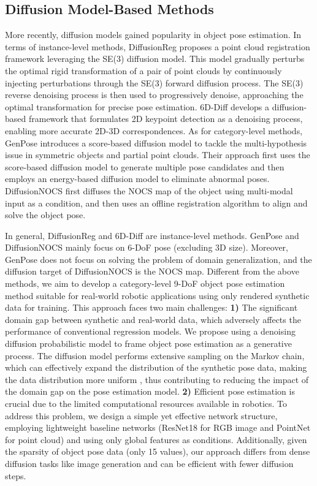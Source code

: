 \vspace{-1em}
\subsection{Diffusion Model-Based Methods}
\par More recently, diffusion models gained popularity in object pose estimation. In terms of instance-level methods, DiffusionReg \cite{DiffusionReg} proposes a point cloud registration framework leveraging the SE(3) diffusion model. This model gradually perturbs the optimal rigid transformation of a pair of point clouds by continuously injecting perturbations through the SE(3) forward diffusion process. The SE(3) reverse denoising process is then used to progressively denoise, approaching the optimal transformation for precise pose estimation. 6D-Diff \cite{6D-Diff} develops a diffusion-based framework that formulates 2D keypoint detection as a denoising process, enabling more accurate 2D-3D correspondences. As for category-level methods, GenPose \cite{42} introduces a score-based diffusion model to tackle the multi-hypothesis issue in symmetric objects and partial point clouds. Their approach first uses the score-based diffusion model to generate multiple pose candidates and then employs an energy-based diffusion model to eliminate abnormal poses. DiffusionNOCS \cite{DiffusionNOCS} first diffuses the NOCS map of the object using multi-modal input as a condition, and then uses an offline registration algorithm to align and solve the object pose.

\par In general, DiffusionReg \cite{DiffusionReg} and 6D-Diff \cite{6D-Diff} are instance-level methods. GenPose \cite{42} and DiffusionNOCS \cite{DiffusionNOCS} mainly focus on 6-DoF pose (excluding 3D size). Moreover, GenPose does not focus on solving the problem of domain generalization, and the diffusion target of DiffusionNOCS is the NOCS map. Different from the above methods, we aim to develop a category-level 9-DoF object pose estimation method suitable for real-world robotic applications using only rendered synthetic data for training. This approach faces two main challenges: \textbf{1)} The significant domain gap between synthetic and real-world data, which adversely affects the performance of conventional regression models. We propose using a denoising diffusion probabilistic model to frame object pose estimation as a generative process. The diffusion model performs extensive sampling on the Markov chain, which can effectively expand the distribution of the synthetic pose data, making the data distribution more uniform \cite{Ed-sam}, thus contributing to reducing the impact of the domain gap on the pose estimation model. \textbf{2)} Efficient pose estimation is crucial due to the limited computational resources available in robotics. To address this problem, we design a simple yet effective network structure, employing lightweight baseline networks (ResNet18 \cite{52} for RGB image and PointNet \cite{53} for point cloud) and using only global features as conditions. Additionally, given the sparsity of object pose data (only 15 values), our approach differs from dense diffusion tasks like image generation and can be efficient with fewer diffusion steps.

